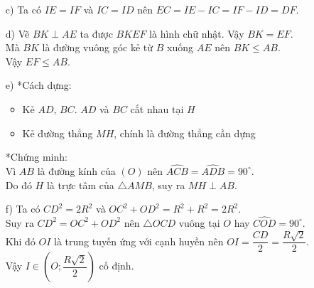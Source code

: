 \begin{bt}
{{
		}
		\begin{enumerate}
			\item[c)] Ta có $IE=IF$ và $IC=ID$ nên $EC=IE-IC=IF-ID=DF$.
			\item[d)] Vẽ $BK\perp AE$ ta được $BKEF$ là hình chữ nhật. Vậy $BK=EF$.\\
			Mà $BK$ là đường vuông góc kẻ từ $B$ xuống $AE$ nên $BK \le AB$.\\
			Vậy $EF\le AB$.
			\item[e)] *Cách dựng:
			\begin{itemize}
				\item Kẻ $AD$, $BC$. $AD$ và $BC$ cắt nhau tại $H$
				\item Kẻ đường thẳng $MH$, chính là đường thẳng cần dựng
			\end{itemize}
			*Chứng minh:\\
			Vì $AB$ là đường kính của $(O)$ nên $\widehat{ACB}=\widehat{ADB}=90^\circ$.\\
			Do đó $H$ là trực tâm của $\triangle AMB$, suy ra $MH\perp  AB$.
			\item[f)] Ta có $CD^2=2R^2$ và $OC^2+OD^2=R^2+R^2=2R^2$.\\
			Suy ra $CD^2=OC^2+OD^2$ nên $\triangle OCD$ vuông tại $O$ hay $\widehat{COD}=90^\circ$.\\
			Khi đó $OI$ là trung tuyến ứng với cạnh huyền nên $OI=\dfrac{CD}{2}=\dfrac{R\sqrt{2}}{2}$.\\
			Vậy $I\in \left( O;\dfrac{R\sqrt{2}}{2}\right)$ cố định.
		\end{enumerate}
	}
\end{bt}

